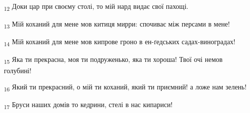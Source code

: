 \begin{tcolorbox}
\textsubscript{12} Доки цар при своєму столі, то мій нард видає свої пахощі.
\end{tcolorbox}
\begin{tcolorbox}
\textsubscript{13} Мій коханий для мене мов китиця мирри: спочиває між персами в мене!
\end{tcolorbox}
\begin{tcolorbox}
\textsubscript{14} Мій коханий для мене мов кипрове гроно в ен-ґедських садах-виноградах!
\end{tcolorbox}
\begin{tcolorbox}
\textsubscript{15} Яка ти прекрасна, моя ти подруженько, яка ти хороша! Твої очі немов голубині!
\end{tcolorbox}
\begin{tcolorbox}
\textsubscript{16} Який ти прекрасний, о мій ти коханий, який ти приємний! а ложе нам зелень!
\end{tcolorbox}
\begin{tcolorbox}
\textsubscript{17} Бруси наших домів то кедрини, стелі в нас кипариси!
\end{tcolorbox}
